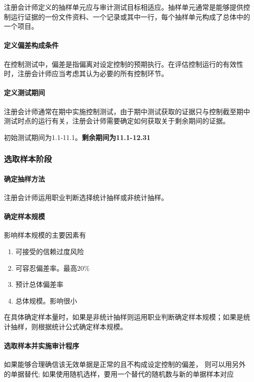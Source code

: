 \documentclass[UTF8,12pt]{ctexart}
\numberwithin{equation}{section} %
\numberwithin{figure}{section}
\numberwithin{table}{section}
\begin{document}
	注册会计师定义的抽样单元应与审计测试目标相适应。抽样单元通常是能够提供控制运行证据的一份文件资料、一个记录或其中一行，每个抽样单元构成了总体中的一个项目。
	
	\paragraph{定义偏差构成条件} 在控制测试中，偏差是指偏离对设定控制的预期执行。在评估控制运行的有效性时，注册会计师应当考虑其认为必要的所有控制环节。
	
	\paragraph{定义测试期间} 注册会计师通常在期中实施控制测试，由于期中测试获取的证据只与控制截至期中测试时点的运行有关，注册会计师需要确定如何获取关于剩余期间的证据。
	
	初始测试期间为1.1-11.1。\textbf{剩余期间为11.1-12.31}
	
	\subsubsection{选取样本阶段}
	\paragraph{确定抽样方法} 注册会计师运用职业判断选择统计抽样或非统计抽样。
	
	\paragraph{确定样本规模} 影响样本规模的主要因素有
	\begin{enumerate}
		\item 可接受的信赖过度风险
		
		\item 可容忍偏差率。最高20\%
		
		\item 预计总体偏差率
		
		\item 总体规模。影响很小
	\end{enumerate}
	
	在具体确定样本量时，如果是非统计抽样则运用职业判断确定样本规模；如果是统计抽样，则根据统计公式确定样本规模。
	
	\paragraph{选取样本并实施审计程序} 如果能够合理确信该无效单据是正常的且不构成设定控制的偏差， 则可以用另外的单据替代; 如果使用随机选样，要用一个替代的随机数与新的单据样本对应
	
\end{document}

